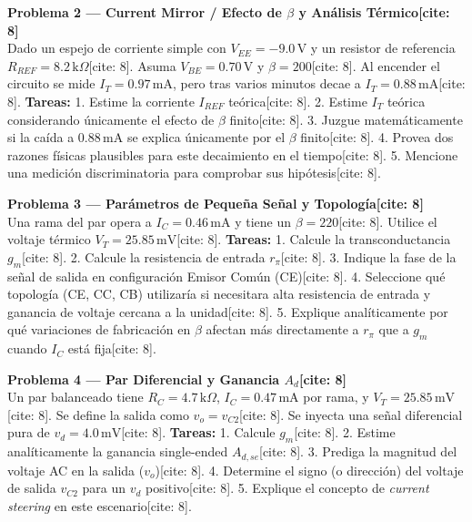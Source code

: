 \documentclass[11pt, a4paper]{article}
\begin{document}
\vspace{0.3cm}
\noindent \textbf{Problema 2 — Current Mirror / Efecto de $\beta$ y Análisis Térmico[cite: 8]} \\
Dado un espejo de corriente simple con $V_{EE}=-9.0\,\text{V}$ y un resistor de referencia $R_{REF}=8.2\,\text{k}\Omega$[cite: 8]. Asuma $V_{BE}=0.70\,\text{V}$ y $\beta=200$[cite: 8]. Al encender el circuito se mide $I_T=0.97\,\text{mA}$, pero tras varios minutos decae a $I_T=0.88\,\text{mA}$[cite: 8].
\textbf{Tareas:}
1. Estime la corriente $I_{REF}$ teórica[cite: 8].
2. Estime $I_T$ teórica considerando únicamente el efecto de $\beta$ finito[cite: 8].
3. Juzgue matemáticamente si la caída a $0.88\,\text{mA}$ se explica únicamente por el $\beta$ finito[cite: 8].
4. Provea dos razones físicas plausibles para este decaimiento en el tiempo[cite: 8].
5. Mencione una medición discriminatoria para comprobar sus hipótesis[cite: 8].

\vspace{0.3cm}
\noindent \textbf{Problema 3 — Parámetros de Pequeña Señal y Topología[cite: 8]} \\
Una rama del par opera a $I_C=0.46\,\text{mA}$ y tiene un $\beta=220$[cite: 8]. Utilice el voltaje térmico $V_T=25.85\,\text{mV}$[cite: 8].
\textbf{Tareas:}
1. Calcule la transconductancia $g_m$[cite: 8].
2. Calcule la resistencia de entrada $r_\pi$[cite: 8].
3. Indique la fase de la señal de salida en configuración Emisor Común (CE)[cite: 8].
4. Seleccione qué topología (CE, CC, CB) utilizaría si necesitara alta resistencia de entrada y ganancia de voltaje cercana a la unidad[cite: 8].
5. Explique analíticamente por qué variaciones de fabricación en $\beta$ afectan más directamente a $r_\pi$ que a $g_m$ cuando $I_C$ está fija[cite: 8].

\vspace{0.3cm}
\noindent \textbf{Problema 4 — Par Diferencial y Ganancia $A_d$[cite: 8]} \\
Un par balanceado tiene $R_C=4.7\,\text{k}\Omega$, $I_C=0.47\,\text{mA}$ por rama, y $V_T=25.85\,\text{mV}$[cite: 8]. Se define la salida como $v_o=v_{C2}$[cite: 8]. Se inyecta una señal diferencial pura de $v_d=4.0\,\text{mV}$[cite: 8].
\textbf{Tareas:}
1. Calcule $g_m$[cite: 8].
2. Estime analíticamente la ganancia single-ended $A_{d,se}$[cite: 8].
3. Prediga la magnitud del voltaje AC en la salida ($v_o$)[cite: 8].
4. Determine el signo (o dirección) del voltaje de salida $v_{C2}$ para un $v_d$ positivo[cite: 8].
5. Explique el concepto de \textit{current steering} en este escenario[cite: 8].
\end{document}
